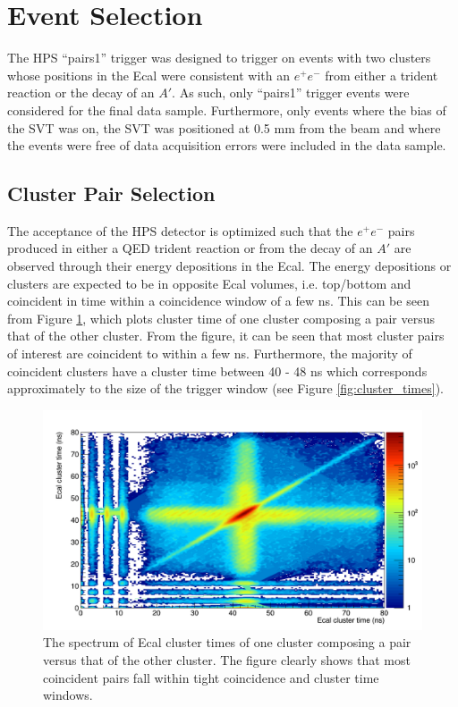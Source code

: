 \section{Event Selection}

The HPS ``pairs1'' trigger was designed to trigger on events with two clusters
whose positions in the Ecal were consistent with an $e^+e^-$ from either a trident 
reaction or the decay of an $A'$. As such, only ``pairs1'' trigger events
were considered for the final data sample.  Furthermore, only events where the
bias of the SVT was on, the SVT was positioned at 0.5 mm from the beam and 
where the events were free of data acquisition errors were included in the data sample.

\subsection{Cluster Pair Selection}

The acceptance of the HPS detector is optimized such that the $e^+e^-$ pairs
produced in either a QED trident reaction or from the decay of an 
$A'$ are observed through their energy depositions in the Ecal.  The energy
depositions or clusters are expected to be in opposite Ecal volumes, i.e. 
top/bottom and coincident in time within a coincidence window of a few ns.  This
can be seen from Figure \ref{fig:cluster_times_2d}, which plots  
cluster time of one cluster composing a pair versus that of the other cluster. 
From the figure, it can be seen that most cluster pairs of interest are 
coincident to within a few ns. Furthermore, the majority of coincident clusters
have a cluster time between 40 - 48 ns which corresponds approximately
to the size of the trigger window (see Figure \ref{fig:cluster_times}). 
\begin{figure}[t]
    \centering
    \includegraphics[width=\textwidth]{images/20160428_pass4_cluster_time_v_cluster_time.png}
    \caption{The spectrum of Ecal cluster times of one cluster composing a pair 
            versus that of the other cluster. The figure clearly shows that most coincident pairs 
             fall within tight coincidence and cluster time windows.}
    \label{fig:cluster_times_2d}
\end{figure}  


